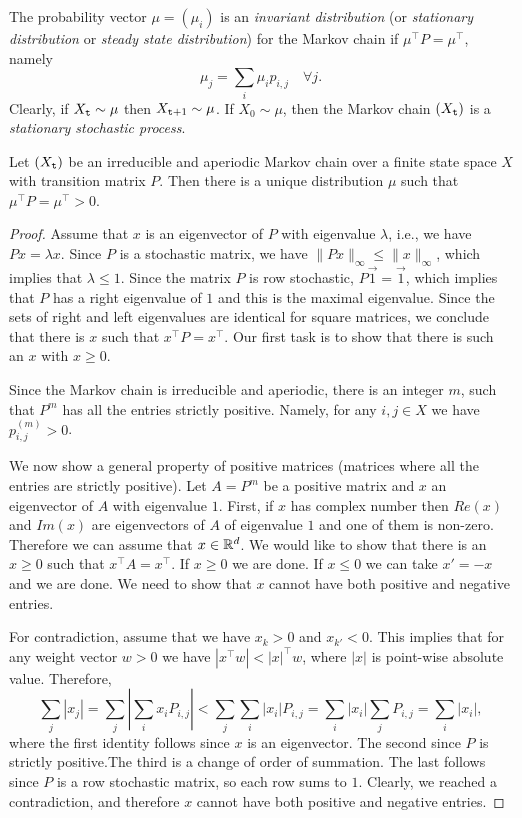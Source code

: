 The probability vector $\mu  = ({\mu_i})$ is an \emph{invariant
distribution} (or \emph{stationary distribution} or \emph{steady state
distribution}) for the Markov chain if $\mu^\top P = \mu^\top$,
namely
\[{\mu_j} = \sum_i {{\mu_i}} {p_{i,j}}\quad \forall j.\]
Clearly, if ${X_{\tt t}} \sim \mu $ then ${X_{{\tt t} + 1}} \sim \mu
$. If ${X_0} \sim \mu $, then the Markov chain $({X_{\tt t}})$ is a
\emph{stationary stochastic process}.


\begin{theorem}
\label{Thm:MC-stationary}
 Let $({X_{\tt t}})$ be an irreducible and
aperiodic Markov chain over a finite state space $X$ with
transition matrix $P$. Then there is a unique distribution $\mu$
such that $\mu^\top P = \mu^\top >0$.
\end{theorem}

\begin{proof}
Assume that $x$ is an eigenvector of $P$ with eigenvalue $\lambda$,
i.e., we have $Px=\lambda x$. Since $P$ is a stochastic matrix, we
have $\|P x\|_\infty \leq \|x\|_\infty$, which implies that $\lambda
\leq 1$. Since the matrix $P$ is row stochastic, $P\vec{1}=\vec{1}$,
which implies that $P$ has a right eigenvalue of $1$ and this is the
maximal eigenvalue. Since the sets of right and left eigenvalues are
identical for square matrices, we conclude that there is $x$ such that $x^\top P=x^\top$.
Our first task is to show that there is such an $x$ with $x\geq0$.

Since the Markov chain is irreducible and aperiodic, there is an
integer $m$, such that $P^m$ has all the entries strictly positive.
Namely, for any $i,j\in X$ we have $p^{(m)}_{i,j}>0$.

We now show a general property of positive matrices (matrices where
all the entries are strictly positive). Let $A=P^m$ be a positive
matrix and $x$ an eigenvector of $A$ with eigenvalue $1$. First, if
$x$ has complex number then $Re(x)$ and $Im(x)$ are eigenvectors
of $A$ of eigenvalue $1$ and one of them is non-zero. Therefore we
can assume that $x\in \mathbb{R}^d$. We would like to show that there is
an $x\geq 0$ such that $x^\top A=x^\top$. If $x\geq 0$ we are done.
If $x\leq 0$ we can take $x'=-x$ and we are done. We need to show
that $x$ cannot have both positive and negative entries.

For contradiction, assume that we have $x_{k}>0$ and $x_{k'}<0$.
This implies that for any weight vector $w>0$ we have $|x^\top w| <
|x|^\top w$, where $|x|$ is point-wise absolute value. Therefore,
\[
\sum_j |x_j|= \sum_j |\sum_i x_i P_{i,j}| < \sum_j \sum_i |x_i|
P_{i,j}=  \sum_i |x_i| \sum_j P_{i,j}= \sum_i |x_i|,
\]
where the first identity follows since $x$ is an eigenvector. The
second since $P$ is strictly positive.The third is a change of order
of summation. The last follows since $P$ is a row stochastic matrix, so
each row sums to $1$. Clearly, we reached a contradiction, and
therefore $x$ cannot have both positive and negative entries.


\end{proof}
